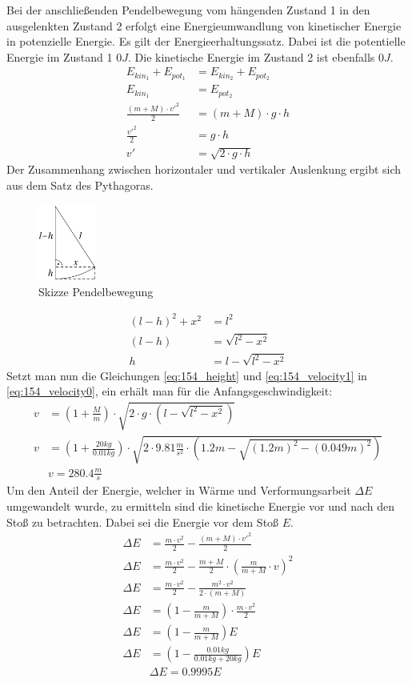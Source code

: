 \documentclass{article}
\begin{document}
	Bei der anschließenden Pendelbewegung vom hängenden Zustand 1 in den ausgelenkten Zustand 2 erfolgt eine Energieumwandlung von kinetischer Energie in potenzielle Energie. Es gilt der Energieerhaltungssatz. Dabei ist die potentielle Energie im Zustand 1 $0J$. Die kinetische Energie im Zustand 2 ist ebenfalls $0J$.
	\begin{align}
		E_{kin_1}+E_{pot_1}&=E_{kin_2}+E_{pot_2}		\nonumber\\
		E_{kin_1}&=E_{pot_2}							\nonumber\\
		\frac{(m+M)\cdot v'^2}{2}&=(m+M)\cdot g\cdot h	\nonumber\\
		\frac{v'^2}{2}&=g\cdot h						\nonumber\\
		v'&=\sqrt{2\cdot g\cdot h}						\label{eq:154_velocity1}
	\end{align}
	Der Zusammenhang zwischen horizontaler und vertikaler Auslenkung ergibt sich aus dem Satz des Pythagoras.
	\begin{figure}[h]
		\centering
		\includegraphics[height=2.5cm]{images/154_1.png}
		\caption{Skizze Pendelbewegung}
	\end{figure}
	\begin{align}
		(l-h)^2+x^2&=l^2		\nonumber\\
		(l-h)&=\sqrt{l^2-x^2}	\nonumber\\
		h&=l-\sqrt{l^2-x^2}		\label{eq:154_height}
	\end{align}
	Setzt man nun die Gleichungen \eqref{eq:154_height} und \eqref{eq:154_velocity1} in \eqref{eq:154_velocity0}, ein erhält man für die Anfangsgeschwindigkeit:
	\begin{align*}
		v&=\left(1+\frac{M}{m}\right)\cdot\sqrt{2\cdot g\cdot\left(l-\sqrt{l^2-x^2}\right)}\\
		v&=\left(1+\frac{20kg}{0.01kg}\right)\cdot\sqrt{2\cdot 9.81\frac{m}{s^2}\cdot\left(1.2m-\sqrt{(1.2m)^2-(0.049m)^2}\right)}\\
		&\boxed{v=280.4\frac{m}{s}}		\tag{a} \label{eq:154_a}
	\end{align*}
	Um den Anteil der Energie, welcher in Wärme und Verformungsarbeit $\Delta E$ umgewandelt wurde, zu ermitteln sind die kinetische Energie vor und nach den Stoß zu betrachten. Dabei sei die Energie vor dem Stoß $E$.
	\begin{align*}
		\Delta E&=\frac{m\cdot v^2}{2}-\frac{(m+M)\cdot v'^2}{2}\\
		\Delta E&=\frac{m\cdot v^2}{2}-\frac{m+M}{2}\cdot \left(\frac{m}{m+M}\cdot v\right)^2\\
		\Delta E&=\frac{m\cdot v^2}{2}-\frac{m^2\cdot v^2}{2\cdot(m+M)}\\
		\Delta E&=\left(1-\frac{m}{m+M}\right)\cdot\frac{m\cdot v^2}{2}\\
		\Delta E&=\left(1-\frac{m}{m+M}\right)E\\
		\Delta E&=\left(1-\frac{0.01kg}{0.01kg+20kg}\right)E\\
		&\boxed{\Delta E=0.9995E}		\tag{b}	\label{eq:154_b}
	\end{align*}
\end{document}
